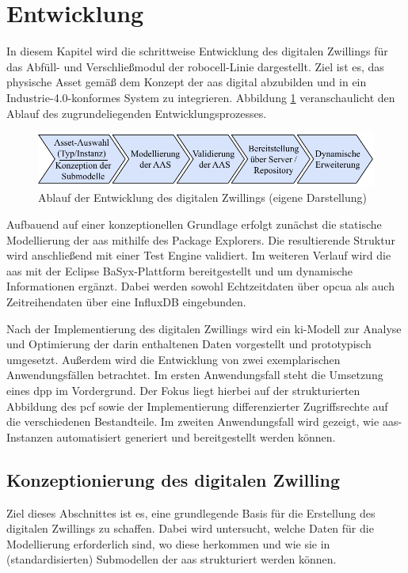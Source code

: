 \newpage
\section{Entwicklung}
In diesem Kapitel wird die schrittweise Entwicklung des digitalen Zwillings für das Abfüll- und Verschließmodul der robocell-Linie dargestellt.
Ziel ist es, das physische Asset gemäß dem Konzept der \acs{aas} digital abzubilden und in ein Industrie-4.0-konformes System zu integrieren.
Abbildung \ref{fig:Entwicklungsschritte} veranschaulicht den Ablauf des zugrundeliegenden Entwicklungsprozesses.

\begin{figure}[htbp]
    \centering
    \includegraphics[width=1\textwidth]{Bilder/vorgehenEntwicklungsteil.pdf}
    \caption[Ablauf der Entwicklung des digitalen Zwillings]{Ablauf der Entwicklung des digitalen Zwillings (eigene Darstellung)}
    \label{fig:Entwicklungsschritte}
\end{figure}
\vspace{-1em}

Aufbauend auf einer konzeptionellen Grundlage erfolgt zunächst die statische Modellierung der \acs{aas} mithilfe des Package Explorers. 
Die resultierende Struktur wird anschließend mit einer Test Engine validiert.
Im weiteren Verlauf wird die \acs{aas} mit der Eclipse BaSyx-Plattform bereitgestellt und um dynamische Informationen ergänzt. 
Dabei werden sowohl Echtzeitdaten über \acs{opcua} als auch Zeitreihendaten über eine InfluxDB eingebunden.

Nach der Implementierung des digitalen Zwillings wird ein \acs{ki}-Modell zur Analyse und Optimierung der darin enthaltenen Daten vorgestellt und prototypisch umgesetzt.
Außerdem wird die Entwicklung von zwei exemplarischen Anwendungsfällen betrachtet.
Im ersten Anwendungsfall steht die Umsetzung eines \acs{dpp} im Vordergrund. 
Der Fokus liegt hierbei auf der strukturierten Abbildung des \acs{pcf} sowie der Implementierung differenzierter Zugriffsrechte auf die verschiedenen Bestandteile.
Im zweiten Anwendungsfall wird gezeigt, wie \acs{aas}-Instanzen automatisiert generiert und bereitgestellt werden können.

\subsection{Konzeptionierung des digitalen Zwilling}
Ziel dieses Abschnittes ist es, eine grundlegende Basis für die Erstellung des digitalen Zwillings zu schaffen.
Dabei wird untersucht, welche Daten für die Modellierung erforderlich sind, wo diese herkommen und wie sie in (standardisierten) Submodellen der \acs{aas} strukturiert werden können.
